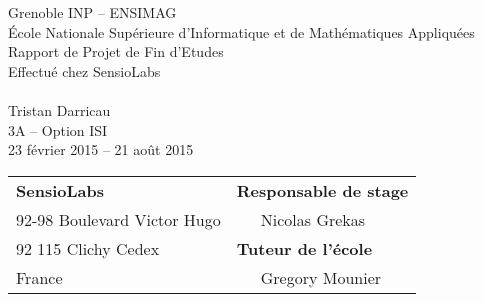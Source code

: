 \begin{titlingpage}
  \thispagestyle{empty}
  
  \begin{center}
    \makebox[\textwidth][l]{
      \raisebox{-8pt}[0pt][0pt]{
        \logoBF[scale=0.2]
        \logoSL[scale=0.2]
      }
    }
    \makebox[\textwidth][r]{
      \raisebox{0pt}[0pt][0pt]{
        \logoIMAG[scale=0.2]
      }
    }
    Grenoble INP  -- ENSIMAG\\
    École Nationale Supérieure d'Informatique et de Mathématiques Appliquées\\
    \vspace{3cm}
    {\LARGE Rapport de Projet de Fin d'Etudes}\\
    \vspace{1cm}
    Effectué chez SensioLabs\\
    \vspace{2cm}
    \\
    \vspace{3cm}
    Tristan Darricau\\
    3A -- Option ISI\\
    \vspace{3mm}
    23 février 2015 -- 21 août 2015\\
    \vspace{3,5cm}
    \begin{tabular}{p{10cm}p{10cm}}
      {\textbf{SensioLabs}}                                            &{\textbf{Responsable de stage}}\\
      {\footnotesize 92-98 Boulevard Victor Hugo}       & ~~~Nicolas Grekas\\
      {\footnotesize 92 115 Clichy Cedex }                                        & {\textbf{Tuteur de l'école}}\\
      {\footnotesize France}                          & ~~~Gregory Mounier\\
    \end{tabular}
  \end{center}
\end{titlingpage}
